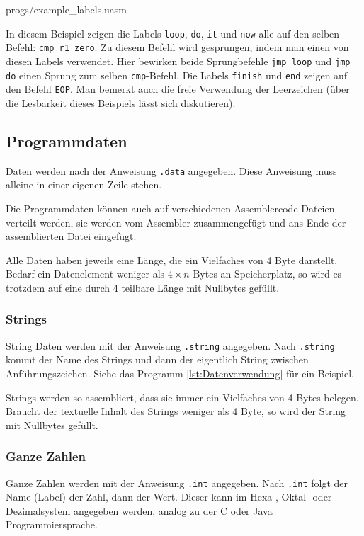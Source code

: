 
{progs/example_labels.uasm}

In diesem Beispiel zeigen die Labels \texttt{loop}, \texttt{do}, \texttt{it} und
\texttt{now} alle auf den selben Befehl: \texttt{cmp r1 zero}. Zu diesem Befehl
wird gesprungen, indem man einen von diesen Labels verwendet. Hier bewirken
beide Sprungbefehle \texttt{jmp loop} und \texttt{jmp do} einen Sprung zum
selben \texttt{cmp}-Befehl. Die Labels \texttt{finish} und \texttt{end} zeigen
auf den Befehl \texttt{EOP}. Man bemerkt auch die freie Verwendung der
Leerzeichen (über die Lesbarkeit dieses Beispiels lässt sich diskutieren).


\subsection{Programmdaten}

Daten werden nach der Anweisung \texttt{.data} angegeben. Diese Anweisung muss
alleine in einer eigenen Zeile stehen.

Die Programmdaten können auch auf verschiedenen Assemblercode-Dateien verteilt
werden, sie werden vom Assembler zusammengefügt und ans Ende der assemblierten
Datei eingefügt.

Alle Daten haben jeweils eine Länge, die ein Vielfaches von 4 Byte darstellt.
Bedarf ein Datenelement weniger als $4 \times n$ Bytes an Speicherplatz, so wird
es trotzdem auf eine durch 4 teilbare Länge mit Nullbytes gefüllt.

\subsubsection{Strings}

String Daten werden mit der Anweisung \texttt{.string} angegeben. Nach
\texttt{.string} kommt der Name des Strings und dann der eigentlich String
zwischen Anführungszeichen. Siehe das Programm \ref{lst:Datenverwendung} für ein
Beispiel.

Strings werden so assembliert, dass sie immer ein Vielfaches von 4 Bytes
belegen. Braucht der textuelle Inhalt des Strings weniger als 4 Byte, so wird
der String mit Nullbytes gefüllt.


\subsubsection{Ganze Zahlen}

Ganze Zahlen werden mit der Anweisung \texttt{.int} angegeben. Nach
\texttt{.int} folgt der Name (Label) der Zahl, dann der Wert. Dieser
kann im Hexa-, Oktal- oder Dezimalsystem angegeben werden, analog zu der
C oder Java Programmiersprache.

